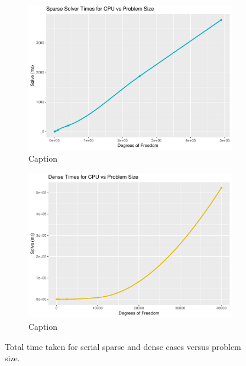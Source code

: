 \begin{figure}
	\centering
	\begin{subfigure}{0.48\linewidth}
		\centering
		\includegraphics[width = \linewidth]{Plots/solve_sparse_cpu}
		\caption{Caption}
		\label{fig:solve_sparse_cpu}
	\end{subfigure}\hfill
	\begin{subfigure}{0.48\linewidth}
		\centering
		\includegraphics[width=\linewidth]{Plots/solve_dense_cpu}
		\caption{Caption}
		\label{fig:solve_dense_cpu}
	\end{subfigure}
	\caption{Total time taken for serial sparse and dense cases versus problem size.}
	\label{fig:solve_cpu}
\end{figure}


